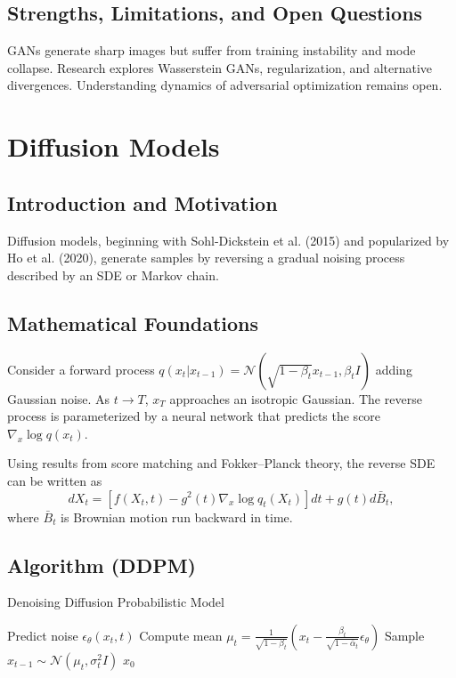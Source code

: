 \documentclass[11pt]{book}
\begin{document}
\subsection{Strengths, Limitations, and Open Questions}
GANs generate sharp images but suffer from training instability and mode collapse. Research explores Wasserstein GANs, regularization, and alternative divergences. Understanding dynamics of adversarial optimization remains open.

\section{Diffusion Models}
\subsection{Introduction and Motivation}
Diffusion models, beginning with Sohl-Dickstein et al. (2015) and popularized by Ho et al. (2020), generate samples by reversing a gradual noising process described by an SDE or Markov chain.

\subsection{Mathematical Foundations}
Consider a forward process $q(x_t|x_{t-1})=\mathcal{N}(\sqrt{1-\beta_t}x_{t-1},\beta_t I)$ adding Gaussian noise. As $t\to T$, $x_T$ approaches an isotropic Gaussian. The reverse process is parameterized by a neural network that predicts the score $\nabla_x \log q(x_t)$.

Using results from score matching \cite{hyvarinen2005} and Fokker--Planck theory, the reverse SDE can be written as
\begin{equation}
dX_t = \left[f(X_t,t) - g^2(t)\nabla_x \log q_t(X_t)\right]dt + g(t)d\bar{B}_t,
\end{equation}
where $\bar{B}_t$ is Brownian motion run backward in time.

\subsection{Algorithm (DDPM)}
\begin{algorithm}
\caption{Denoising Diffusion Probabilistic Model}
\begin{algorithmic}[1]
    \STATE Predict noise $\epsilon_\theta(x_t,t)$
    \STATE Compute mean $\mu_t=\frac{1}{\sqrt{1-\beta_t}}(x_t-\frac{\beta_t}{\sqrt{1-\bar{\alpha}_t}}\epsilon_\theta)$
    \STATE Sample $x_{t-1}\sim\mathcal{N}(\mu_t,\sigma_t^2 I)$
\ENDFOR
\RETURN $x_0$
\end{algorithmic}
\end{algorithm}
\end{document}
